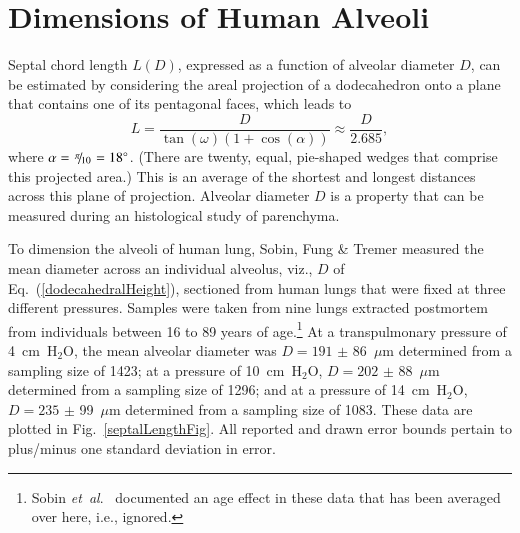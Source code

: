 \section{Dimensions of Human Alveoli}
\label{alveolarSize}

Septal chord length $L(D)$, expressed as a function of alveolar diameter $D$, can be estimated by considering the areal projection of a dodecahedron onto a plane that contains one of its pentagonal faces, which leads to
\begin{equation}
	L = \frac{D}{\tan ( \omega ) ( 1 + \cos ( \alpha ) )} 
	\approx  \frac{D}{2.685} ,
\label{dodecahedralHeight}
\end{equation} 
where $\alpha = \textfrac{\pi}{10} = 18^{\circ}$.  (There are twenty, equal, pie-shaped wedges that comprise this projected area.)  This is an average of the shortest and longest distances across this plane of projection.  Alveolar diameter $D$ is a property that can be measured during an histological study of parenchyma.  

To dimension the alveoli of human lung, Sobin, Fung \& Tremer \cite{Sobinetal88} measured the mean diameter across an individual alveolus, viz., $D$ of Eq.~(\ref{dodecahedralHeight}),  sectioned from human lungs that were fixed at three different pressures.  Samples were taken from nine lungs extracted postmortem from individuals between 16 to 89 years of age.\footnote{%
	Sobin \textit{et~al}.\ \cite{Sobinetal88} documented an age effect in these data that has been averaged over here, i.e., ignored.
}
At a transpulmonary pressure of 4~cm~$\text{H}_2$O, the mean alveolar diameter was $D = 191$ $\pm$ 86~$\mu$m determined from a sampling size of 1423; at a pressure of 10~cm~$\text{H}_2$O, $D = 202$ $\pm$ 88~$\mu$m determined from a sampling size of 1296; and at a pressure of 14~cm~$\text{H}_2$O, $D = 235$ $\pm$ 99~$\mu$m determined from a sampling size of 1083.  These data are plotted in Fig.~\ref{septalLengthFig}.  All reported and drawn error bounds pertain to plus\slash minus one standard deviation in error.


